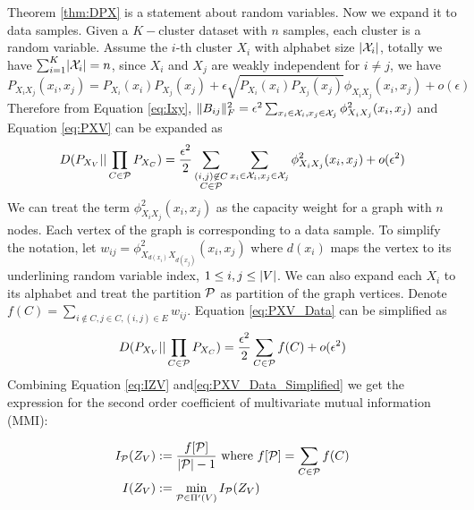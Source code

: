 Theorem \ref{thm:DPX} is a statement about random variables. Now we expand it to data samples. Given a $K-$cluster dataset with $n$ samples, each cluster is a random variable. 
Assume the $i$-th cluster $X_i$ with alphabet size $\abs{\mathcal{X}_i}$, totally
we have $\sum_{i=1}^K \abs{\mathcal{X}_i} = n$,
since $X_i$ and $X_j$ are weakly independent for $i\neq j$, we have
\begin{equation}\label{eq:phi_w}
P_{X_iX_j}(x_i, x_j) = P_{X_i}(x_i)P_{X_j}(x_j) + \epsilon \sqrt{P_{X_i}(x_i)P_{X_j}(x_j)} \phi_{X_iX_j}(x_i, x_j) + o(\epsilon)
\end{equation}
Therefore from Equation \eqref{eq:Ixy}, $\norm{B_{ij}}_F^2 = \epsilon^2 \sum_{x_i \in \mathcal{X}_i, x_j \in \mathcal{X}_j} \phi^2_{X_iX_j}(x_i, x_j)$ and Equation \eqref{eq:PXV} can be expanded as
\begin{equation}\label{eq:PXV_Data}
D(P_{X_V} || \prod_{C\in \P} P_{X_{C}}) = {\epsilon^2\over 2}\sum_{\substack{(i,j) \not\in C\\ C\in \P}} \sum_{x_i \in \mathcal{X}_i, x_j \in \mathcal{X}_j}  \phi^2_{X_iX_j}(x_i, x_j) + o(\epsilon^2)
\end{equation}
We can treat the term $\phi^2_{X_iX_j}(x_i, x_j)$ as the capacity weight for a graph with $n$ nodes. Each vertex of the graph is corresponding to a data sample.
To simplify the notation, let $w_{ij} = \phi^2_{X_{d(x_i)}X_{d(x_j)}}(x_i, x_j)$ where $d(x_i)$ maps the vertex to its underlining random variable index, $1\leq i,j \leq \abs{V}$.
We can also expand each $X_i$ to its alphabet and treat the partition $\P$ as partition of the graph vertices.
Denote $f(C) = \sum_{i\not\in C, j\in C, (i,j) \in E} w_{ij}$. Equation \eqref{eq:PXV_Data} can be simplified as
\begin{equation}\label{eq:PXV_Data_Simplified}
D(P_{X_V} || \prod_{C\in \P} P_{X_{C}}) = {\epsilon^2\over 2}\sum_{C \in \P} f(C)+ o(\epsilon^2)
\end{equation}
Combining Equation \eqref{eq:IZV} and\eqref{eq:PXV_Data_Simplified} we get the expression for the second order coefficient of multivariate mutual information (MMI):
\begin{definition}\label{def:ms}
	\begin{align}
	I_{\P}(Z_V) & := \frac{ f[\P] }{  \abs{\mathcal{P}} - 1 } \textrm{ where } f[\P] = \sum_{C\in \P}f(C) \label{eq:ms_first}\\
	I(Z_V) & := \min_{\mathcal{P} \in \Pi'(V)} I_{\mathcal{P}}(Z_V)  \label{eq:ms}
	\end{align}
\end{definition}

